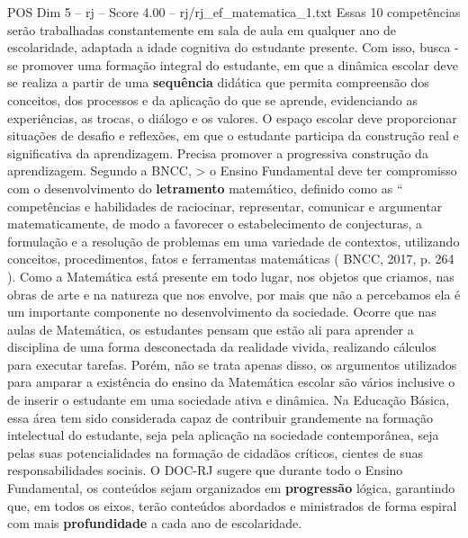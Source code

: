 \begin{textsample}{POS Dim 5 – rj – Score 4.00 – rj/rj\_ef\_matematica\_1.txt}
Essas 10 competências serão trabalhadas constantemente em sala de aula em qualquer ano de escolaridade, adaptada a idade cognitiva do estudante presente.
Com isso, busca -se promover uma formação integral do estudante, em que a dinâmica escolar deve se realiza a partir de uma \textbf{sequência} didática que permita compreensão dos conceitos, dos processos e da aplicação do que se aprende, evidenciando as experiências, as trocas, o diálogo e os valores.
O espaço escolar deve proporcionar situações de desafio e reflexões, em que o estudante participa da construção real e significativa da aprendizagem.
Precisa promover a progressiva construção da aprendizagem.
Segundo a BNCC, > o Ensino Fundamental deve ter compromisso com o desenvolvimento do \textbf{letramento} matemático, definido como as “ competências e habilidades de raciocinar, representar, comunicar e argumentar matematicamente, de modo a favorecer o estabelecimento de conjecturas, a formulação e a resolução de problemas em uma variedade de contextos, utilizando conceitos, procedimentos, fatos e ferramentas matemáticas ( BNCC, 2017, p. 264 ).
Como a Matemática está presente em todo lugar, nos objetos que criamos, nas obras de arte e na natureza que nos envolve, por mais que não a percebamos ela é um importante componente no desenvolvimento da sociedade.
Ocorre que nas aulas de Matemática, os estudantes pensam que estão ali para aprender a disciplina de uma forma desconectada da realidade vivida, realizando cálculos para executar tarefas.
Porém, não se trata apenas disso, os argumentos utilizados para amparar a existência do ensino da Matemática escolar são vários inclusive o de inserir o estudante em uma sociedade ativa e dinâmica.
Na Educação Básica, essa área tem sido considerada capaz de contribuir grandemente na formação intelectual do estudante, seja pela aplicação na sociedade contemporânea, seja pelas suas potencialidades na formação de cidadãos críticos, cientes de suas responsabilidades sociais.
O DOC-RJ sugere que durante todo o Ensino Fundamental, os conteúdos sejam organizados em \textbf{progressão} lógica, garantindo que, em todos os eixos, terão conteúdos abordados e ministrados de forma espiral com mais \textbf{profundidade} a cada ano de escolaridade.

\end{textsample}
